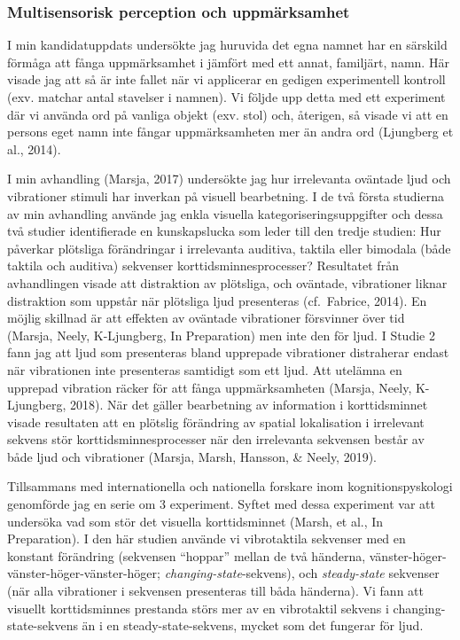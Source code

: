 \documentclass[]{article}
\begin{document}
\hypertarget{multisensorisk-perception-och-uppmuxe4rksamhet}{%
\subsubsection{Multisensorisk perception och
uppmärksamhet}\label{multisensorisk-perception-och-uppmuxe4rksamhet}}

I min kandidatuppdats undersökte jag huruvida det egna namnet har en
särskild förmåga att fånga uppmärksamhet i jämfört med ett annat,
familjärt, namn. Här visade jag att så är inte fallet när vi applicerar
en gedigen experimentell kontroll (exv. matchar antal stavelser i
namnen). Vi följde upp detta med ett experiment där vi använda ord på
vanliga objekt (exv. stol) och, återigen, så visade vi att en persons
eget namn inte fångar uppmärksamheten mer än andra ord (Ljungberg et
al., 2014).

I min avhandling (Marsja, 2017) undersökte jag hur irrelevanta oväntade
ljud och vibrationer stimuli har inverkan på visuell bearbetning. I de
två första studierna av min avhandling använde jag enkla visuella
kategoriseringsuppgifter och dessa två studier identifierade en
kunskapslucka som leder till den tredje studien: Hur påverkar plötsliga
förändringar i irrelevanta auditiva, taktila eller bimodala (både
taktila och auditiva) sekvenser korttidsminnesprocesser? Resultatet från
avhandlingen visade att distraktion av plötsliga, och oväntade,
vibrationer liknar distraktion som uppstår när plötsliga ljud
presenteras (cf.~Fabrice, 2014). En möjlig skillnad är att effekten av
oväntade vibrationer försvinner över tid (Marsja, Neely, K-Ljungberg, In
Preparation) men inte den för ljud. I Studie 2 fann jag att ljud som
presenteras bland upprepade vibrationer distraherar endast när
vibrationen inte presenteras samtidigt som ett ljud. Att utelämna en
upprepad vibration räcker för att fånga uppmärksamheten (Marsja, Neely,
K-Ljungberg, 2018). När det gäller bearbetning av information i
korttidsminnet visade resultaten att en plötslig förändring av spatial
lokalisation i irrelevant sekvens stör korttidsminnesprocesser när den
irrelevanta sekvensen består av både ljud och vibrationer (Marsja,
Marsh, Hansson, \& Neely, 2019).

Tillsammans med internationella och nationella forskare inom
kognitionspyskologi genomförde jag en serie om 3 experiment. Syftet med
dessa experiment var att undersöka vad som stör det visuella
korttidsminnet (Marsh, et al., In Preparation). I den här studien
använde vi vibrotaktila sekvenser med en konstant förändring (sekvensen
``hoppar'' mellan de två händerna,
vänster-höger-vänster-höger-vänster-höger;
\emph{changing-state}-sekvens), och \emph{steady-state} sekvenser (när
alla vibrationer i sekvensen presenteras till båda händerna). Vi fann
att visuellt korttidsminnes prestanda störs mer av en vibrotaktil
sekvens i changing-state-sekvens än i en steady-state-sekvens, mycket
som det fungerar för ljud.
\end{document}
